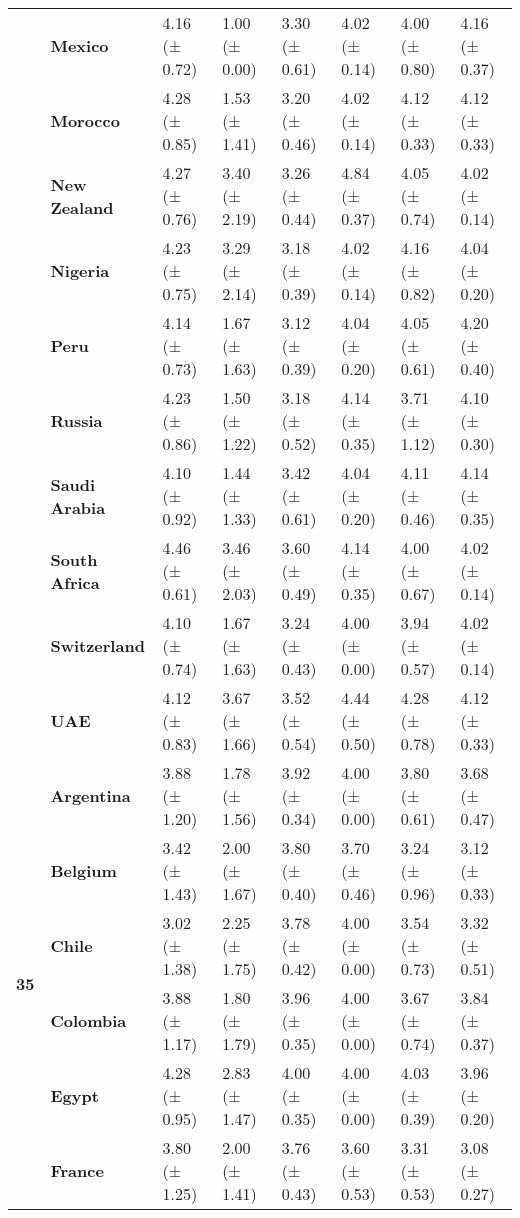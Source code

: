 \begin{longtable}{llllllll}
\textbf{} & \textbf{Mexico} & 4.16 (± 0.72) & 1.00 (± 0.00) & 3.30 (± 0.61) & 4.02 (± 0.14) & 4.00 (± 0.80) & 4.16 (± 0.37) \\
\textbf{} & \textbf{Morocco} & 4.28 (± 0.85) & 1.53 (± 1.41) & 3.20 (± 0.46) & 4.02 (± 0.14) & 4.12 (± 0.33) & 4.12 (± 0.33) \\
\textbf{} & \textbf{New Zealand} & 4.27 (± 0.76) & 3.40 (± 2.19) & 3.26 (± 0.44) & 4.84 (± 0.37) & 4.05 (± 0.74) & 4.02 (± 0.14) \\
\textbf{} & \textbf{Nigeria} & 4.23 (± 0.75) & 3.29 (± 2.14) & 3.18 (± 0.39) & 4.02 (± 0.14) & 4.16 (± 0.82) & 4.04 (± 0.20) \\
\textbf{} & \textbf{Peru} & 4.14 (± 0.73) & 1.67 (± 1.63) & 3.12 (± 0.39) & 4.04 (± 0.20) & 4.05 (± 0.61) & 4.20 (± 0.40) \\
\textbf{} & \textbf{Russia} & 4.23 (± 0.86) & 1.50 (± 1.22) & 3.18 (± 0.52) & 4.14 (± 0.35) & 3.71 (± 1.12) & 4.10 (± 0.30) \\
\textbf{} & \textbf{Saudi Arabia} & 4.10 (± 0.92) & 1.44 (± 1.33) & 3.42 (± 0.61) & 4.04 (± 0.20) & 4.11 (± 0.46) & 4.14 (± 0.35) \\
\textbf{} & \textbf{South Africa} & 4.46 (± 0.61) & 3.46 (± 2.03) & 3.60 (± 0.49) & 4.14 (± 0.35) & 4.00 (± 0.67) & 4.02 (± 0.14) \\
\textbf{} & \textbf{Switzerland} & 4.10 (± 0.74) & 1.67 (± 1.63) & 3.24 (± 0.43) & 4.00 (± 0.00) & 3.94 (± 0.57) & 4.02 (± 0.14) \\
\textbf{} & \textbf{UAE} & 4.12 (± 0.83) & 3.67 (± 1.66) & 3.52 (± 0.54) & 4.44 (± 0.50) & 4.28 (± 0.78) & 4.12 (± 0.33) \\
\cline{1-8}
\multirow[t]{19}{*}{\textbf{35}} & \textbf{Argentina} & 3.88 (± 1.20) & 1.78 (± 1.56) & 3.92 (± 0.34) & 4.00 (± 0.00) & 3.80 (± 0.61) & 3.68 (± 0.47) \\
\textbf{} & \textbf{Belgium} & 3.42 (± 1.43) & 2.00 (± 1.67) & 3.80 (± 0.40) & 3.70 (± 0.46) & 3.24 (± 0.96) & 3.12 (± 0.33) \\
\textbf{} & \textbf{Chile} & 3.02 (± 1.38) & 2.25 (± 1.75) & 3.78 (± 0.42) & 4.00 (± 0.00) & 3.54 (± 0.73) & 3.32 (± 0.51) \\
\textbf{} & \textbf{Colombia} & 3.88 (± 1.17) & 1.80 (± 1.79) & 3.96 (± 0.35) & 4.00 (± 0.00) & 3.67 (± 0.74) & 3.84 (± 0.37) \\
\textbf{} & \textbf{Egypt} & 4.28 (± 0.95) & 2.83 (± 1.47) & 4.00 (± 0.35) & 4.00 (± 0.00) & 4.03 (± 0.39) & 3.96 (± 0.20) \\
\textbf{} & \textbf{France} & 3.80 (± 1.25) & 2.00 (± 1.41) & 3.76 (± 0.43) & 3.60 (± 0.53) & 3.31 (± 0.53) & 3.08 (± 0.27) \\

\end{longtable}
